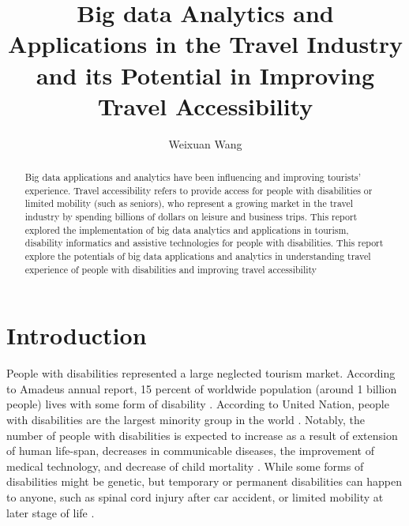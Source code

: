 \title{Big data Analytics and Applications in the Travel Industry and its Potential in Improving Travel Accessibility}


\author{Weixuan Wang}
 

\renewcommand{\shortauthors}{Weixuan Wang}


\begin{abstract}
Big data applications and analytics have been influencing and improving tourists' experience. 
Travel accessibility refers to provide access for people with disabilities or limited mobility 
(such as seniors), who represent a growing market in the travel industry by spending billions 
of dollars on leisure and business trips. This report explored the implementation of big data 
analytics and applications in tourism, disability informatics and assistive technologies for 
people with disabilities. This report explore the potentials of big data applications and analytics 
in understanding travel experience of people with disabilities and improving travel accessibility 
\end{abstract}



\maketitle



\section{Introduction}
People with disabilities represented a large neglected tourism market. According to
Amadeus annual report, 15 percent of worldwide population (around 1 billion people) lives
with some form of disability \cite{Ama}. According to United Nation, people with 
disabilities are the largest minority group in the world
\cite{Appleyard2005,DARCY2010816,Lex}. Notably, the number of people with disabilities is
expected to increase as a  result of extension of human life-span, decreases in
communicable diseases, the improvement of medical technology, and decrease of child
mortality \cite{SMITH1987376}.  While some forms of disabilities might be genetic, but
temporary or permanent disabilities can happen to anyone, such 
as spinal cord injury after car accident, or limited mobility at later stage of life
\cite{Lex}. 


